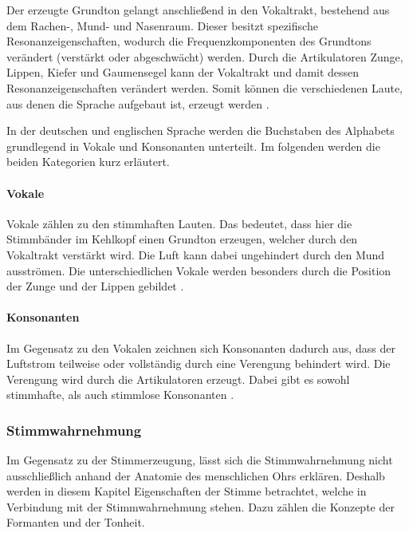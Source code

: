 Der erzeugte Grundton gelangt anschließend in den Vokaltrakt, bestehend aus dem Rachen-, Mund- und Nasenraum.
Dieser besitzt spezifische Resonanzeigenschaften, wodurch die Frequenzkomponenten des Grundtons verändert (verstärkt oder abgeschwächt) werden.
Durch die Artikulatoren Zunge, Lippen, Kiefer und Gaumensegel kann der Vokaltrakt und damit dessen Resonanzeigenschaften verändert werden.
Somit können die verschiedenen Laute, aus denen die Sprache aufgebaut ist, erzeugt werden \autocite[vgl.][S. 13-14]{pfister_sprachverarbeitung_2017}.

In der deutschen und englischen Sprache werden die Buchstaben des Alphabets grundlegend in Vokale und Konsonanten unterteilt.
Im folgenden werden die beiden Kategorien kurz erläutert.

\paragraph{Vokale}
Vokale zählen zu den stimmhaften Lauten.
Das bedeutet, dass hier die Stimmbänder im Kehlkopf einen Grundton erzeugen, welcher durch den Vokaltrakt verstärkt wird.
Die Luft kann dabei ungehindert durch den Mund ausströmen.
Die unterschiedlichen Vokale werden besonders durch die Position der Zunge und der Lippen gebildet \autocite[vgl.][S. 14]{pfister_sprachverarbeitung_2017}.

\paragraph{Konsonanten}
Im Gegensatz zu den Vokalen zeichnen sich Konsonanten dadurch aus, dass der Luftstrom teilweise oder vollständig durch eine Verengung behindert wird.
Die Verengung wird durch die Artikulatoren erzeugt.
Dabei gibt es sowohl stimmhafte, als auch stimmlose Konsonanten \autocite[vgl.][S. 15]{pfister_sprachverarbeitung_2017}.

\subsubsection{Stimmwahrnehmung}
Im Gegensatz zu der Stimmerzeugung, lässt sich die Stimmwahrnehmung nicht ausschließlich anhand der Anatomie des menschlichen Ohrs erklären.
Deshalb werden in diesem Kapitel Eigenschaften der Stimme betrachtet, welche in Verbindung mit der Stimmwahrnehmung stehen.
Dazu zählen die Konzepte der Formanten und der Tonheit.

